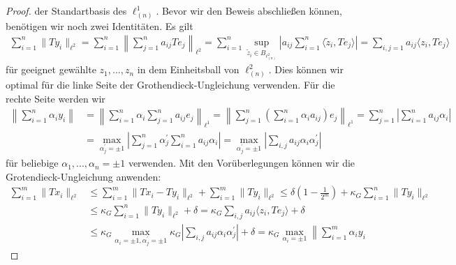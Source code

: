 \begin{proof}
	der Standartbasis des $ \ell_{(n)}^1 $.
	Bevor wir den Beweis abschließen können, benötigen wir noch zwei Identitäten.
	Es gilt
	\begin{align*}
		\sum \limits_{ i = 1}^n \| T y_i \|_{\ell^2}
		=
		\sum \limits_{ i = 1}^n 
		\left\| 
		\sum \limits_{ j= 1}^n
		a_{ij} T e_j
		 \right\|_{\ell^2}
		=
		\sum \limits_{ i = 1}^n 
		\sup\limits_{\tilde{z}_i \in B_{\ell_{(n)}^2}}
		\left|
		a_{ij}
		\sum \limits_{ i = 1}^n 
		\langle \tilde{z}_i , T e_j  \rangle
		\right|
		=
		\sum \limits_{ i, j = 1 }
		a_{ij}
		\langle z_i , T e_j  \rangle
	\end{align*}
	für geeignet gewählte $ z_1,...,z_n  $ in dem Einheitsball von $ \ell_{(n)}^2 $. 
	Dies können wir optimal für die linke Seite der Grothendieck-Ungleichung verwenden.\newpage
	Für die rechte Seite werden wir
	\begin{align*}
		\left\|
		\sum \limits_{i = 1}^n \alpha_i y_i
		\right\|
		&=
		\left\|
		\sum \limits_{i=1}^n
		\alpha_i
		\sum \limits_{j=1}^n
		a_{ij} e_j
		\right\|_{\ell^1}
		=
		\left\|
		\sum \limits_{j=1}^n
		\left(\sum \limits_{i=1}^n
		\alpha_i
		a_{ij}\right) 
		e_j
		\right\|_{\ell^1}
		=
		\sum \limits_{j=1}^n
		\left|
		\sum \limits_{i=1}^n 
		a_{ij} \alpha_i
		\right|\\
		&=
		\max 
		\limits_{ \alpha^\prime_j = \pm 1 }
		\left|
		\sum \limits_{ j= 1}^n \alpha^\prime_j
		\sum \limits_{ i = 1}^n
		a_{ij} \alpha_i
		\right|
		=
		\max 
		\limits_{ \alpha^\prime_j = \pm 1 }
		\left|
		\sum \limits_{i, j} a_{ij} \alpha_i \alpha^\prime_j
		\right|
	\end{align*}
	für beliebige $ \alpha_1,...,\alpha_n = \pm 1 $ verwenden.
	Mit den Vorüberlegungen können wir die Grotendieck-Ungleichung anwenden:
	\begin{align*}
		\sum \limits_{i=1}^m
		\|T x_i \|_{\ell^2}
		&\leq
		\sum \limits_{i=1}^m
		\|T x_i - T y_i \|_{\ell^2}
		+
		\sum \limits_{i=1}^m
		\|T y_i \|_{\ell^2}
		\leq 
		\delta \left(1-\frac{1}{2^m} \right)
		+
		\kappa_G
		\sum \limits_{i=1}^n
		\|T y_i \|_{\ell^2}\\
		&\leq 
		\kappa_G
		\sum \limits_{i=1}^n
		\|T y_i \|_{\ell^2}
		+
		\delta 
		=
		\kappa_G
		\sum \limits_{ i, j }
		a_{ij}
		\langle z_i , T e_j  \rangle
		+ 
		\delta\\	
		&\leq 
		\kappa_G
		\max 
		\limits_{\alpha_i= \pm 1, \alpha^\prime_j = \pm 1 }
		\kappa_G
		\left|
		\sum \limits_{i, j} a_{ij} \alpha_i \alpha^\prime_j
		\right|
		+ \delta 
		=
		\kappa_G
		\max 
		\limits_{\alpha_i= \pm 1 }
		\left\|
		\sum \limits_{i = 1}^m \alpha_i y_i

\end{align*}
\end{proof}
